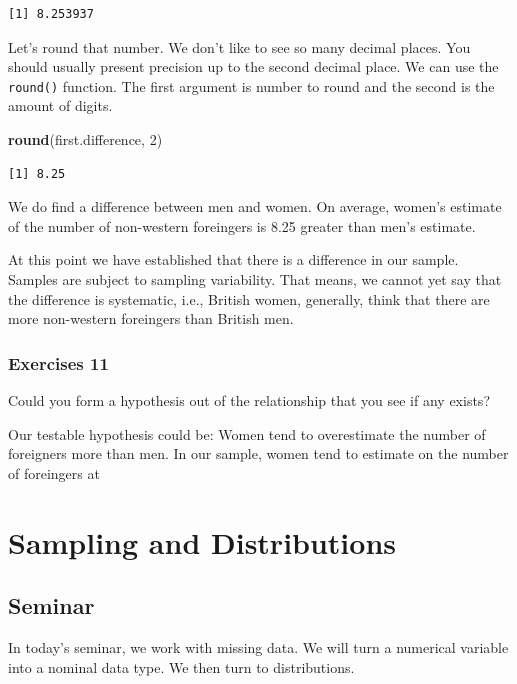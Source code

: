\documentclass[]{article}
\newenvironment{Shaded}{\begin{snugshade}}{\end{snugshade}}
\newcommand{\KeywordTok}[1]{\textcolor[rgb]{0.13,0.29,0.53}{\textbf{#1}}}
\newcommand{\DecValTok}[1]{\textcolor[rgb]{0.00,0.00,0.81}{#1}}
\newcommand{\NormalTok}[1]{#1}
\theoremstyle{definition}
\theoremstyle{definition}
\theoremstyle{definition}
\theoremstyle{remark}
\begin{document}
\begin{verbatim}
[1] 8.253937
\end{verbatim}

Let's round that number. We don't like to see so many decimal places.
You should usually present precision up to the second decimal place. We
can use the \texttt{round()} function. The first argument is number to
round and the second is the amount of digits.

\begin{Shaded}
\begin{Highlighting}[]
\KeywordTok{round}\NormalTok{(first.difference, }\DecValTok{2}\NormalTok{)}
\end{Highlighting}
\end{Shaded}

\begin{verbatim}
[1] 8.25
\end{verbatim}

We do find a difference between men and women. On average, women's
estimate of the number of non-western foreingers is 8.25 greater than
men's estimate.

At this point we have established that there is a difference in our
sample. Samples are subject to sampling variability. That means, we
cannot yet say that the difference is systematic, i.e., British women,
generally, think that there are more non-western foreingers than British
men.

\subsubsection{Exercises 11}\label{exercises-11}

Could you form a hypothesis out of the relationship that you see if any
exists?

Our testable hypothesis could be: Women tend to overestimate the number
of foreigners more than men. In our sample, women tend to estimate on
the number of foreingers at

\section{Sampling and Distributions}\label{sampling-and-distributions}

\subsection{Seminar}\label{seminar-2}

In today's seminar, we work with missing data. We will turn a numerical
variable into a nominal data type. We then turn to distributions.
\end{document}

